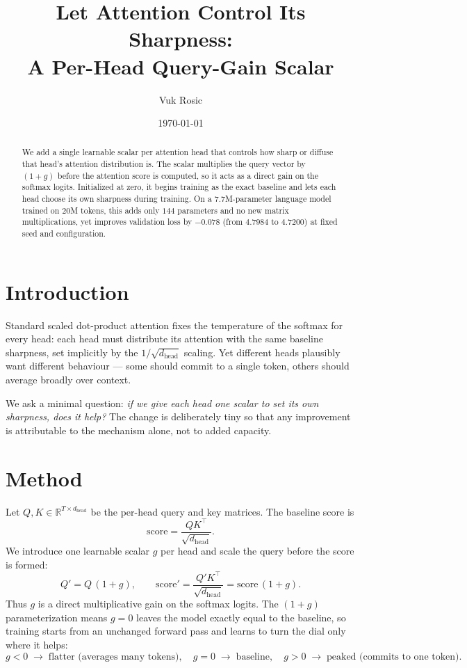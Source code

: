 \documentclass[11pt]{article}
\title{Let Attention Control Its Sharpness:\\ A Per-Head Query-Gain Scalar}
\author{Vuk Rosic}
\date{\today}
\begin{document}
\maketitle

\begin{abstract}
We add a single learnable scalar per attention head that controls how sharp or
diffuse that head's attention distribution is. The scalar multiplies the query
vector by $(1+g)$ before the attention score is computed, so it acts as a direct
gain on the softmax logits. Initialized at zero, it begins training as the exact
baseline and lets each head choose its own sharpness during training. On a
$7.7$M-parameter language model trained on $20$M tokens, this adds only $144$
parameters and no new matrix multiplications, yet improves validation loss by
$-0.078$ (from $4.7984$ to $4.7200$) at fixed seed and configuration.
\end{abstract}

\section{Introduction}
Standard scaled dot-product attention fixes the temperature of the softmax for
every head: each head must distribute its attention with the same baseline
sharpness, set implicitly by the $1/\sqrt{d_{\text{head}}}$ scaling. Yet
different heads plausibly want different behaviour --- some should commit to a
single token, others should average broadly over context.

We ask a minimal question: \emph{if we give each head one scalar to set its own
sharpness, does it help?} The change is deliberately tiny so that any improvement
is attributable to the mechanism alone, not to added capacity.

\section{Method}
Let $Q, K \in \mathbb{R}^{T \times d_{\text{head}}}$ be the per-head query and key
matrices. The baseline score is
\[
\text{score} = \frac{Q K^\top}{\sqrt{d_{\text{head}}}}.
\]
We introduce one learnable scalar $g$ per head and scale the query before the
score is formed:
\[
Q' = Q\,(1 + g), \qquad
\text{score}' = \frac{Q' K^\top}{\sqrt{d_{\text{head}}}} = \text{score}\,(1+g).
\]
Thus $g$ is a direct multiplicative gain on the softmax logits. The $(1+g)$
parameterization means $g = 0$ leaves the model exactly equal to the baseline, so
training starts from an unchanged forward pass and learns to turn the dial only
where it helps:
\[
g < 0 \;\rightarrow\; \text{flatter (averages many tokens)}, \quad
g = 0 \;\rightarrow\; \text{baseline}, \quad
g > 0 \;\rightarrow\; \text{peaked (commits to one token)}.
\]
\end{document}
